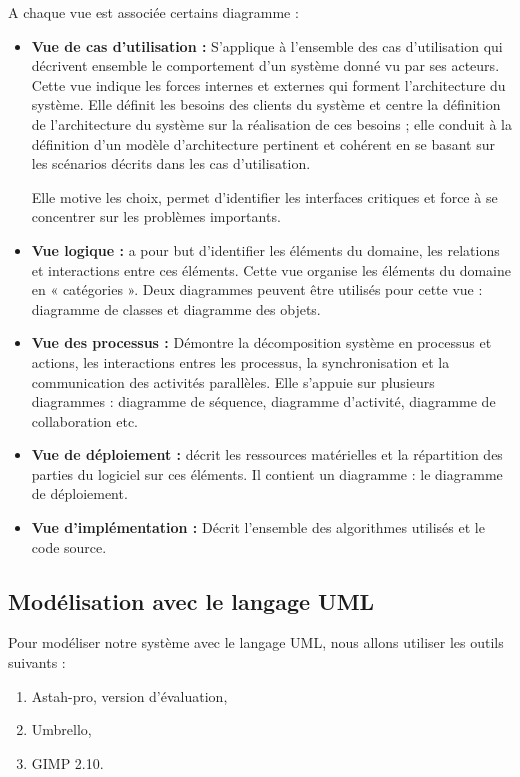 		A chaque vue est associée certains diagramme :
		\begin{itemize}
			\item \textbf{ Vue de cas d'utilisation\cite{opensclass1} :}  S'applique à l'ensemble des cas d'utilisation qui décrivent ensemble le comportement d'un système donné vu par ses acteurs. Cette vue indique les forces internes et externes qui forment l'architecture du système. Elle définit les besoins des clients du système et centre la définition de l'architecture du système sur la réalisation de ces besoins ; elle conduit à la définition d'un modèle d'architecture pertinent et cohérent en se basant sur les scénarios décrits dans les cas d’utilisation.
			
Elle motive les choix, permet d'identifier les interfaces critiques et force à se concentrer sur les problèmes importants.
			\item \textbf{Vue logique : } a pour but d’identifier les éléments du domaine, les relations et interactions entre ces éléments. Cette vue organise les éléments du domaine en « catégories ». Deux diagrammes peuvent être utilisés pour cette vue : diagramme de classes et diagramme des objets.
			\item \textbf{Vue des processus :} Démontre la décomposition système en processus et actions, les interactions entres les processus, la synchronisation et la communication des activités parallèles. Elle s'appuie sur plusieurs diagrammes : diagramme de séquence, diagramme d'activité, diagramme de collaboration etc.
			\item \textbf{Vue de déploiement :} décrit les ressources matérielles et la répartition des parties du logiciel sur ces éléments. Il contient un diagramme : le diagramme de déploiement.
			
			\item \textbf{Vue d'implémentation :} Décrit l'ensemble des algorithmes utilisés et le code source\cite{opensclass1}.


		\end{itemize}
		
		\subsection{Modélisation avec le langage UML}
		Pour modéliser notre système avec le langage UML, nous allons utiliser les outils suivants :
		\begin{enumerate}
			\item Astah-pro, version d'évaluation,
			\item Umbrello,
			\item GIMP 2.10.
		\end{enumerate}
			
